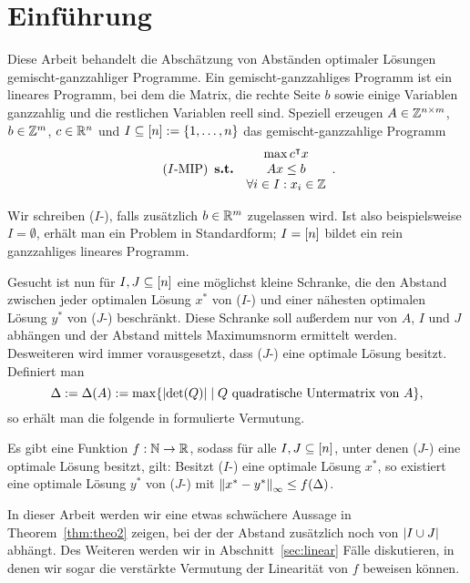 \section{Einführung}\label{introduction}

Diese Arbeit behandelt die Abschätzung von Abständen optimaler Lösungen
gemischt-ganzzahliger Programme.
Ein gemischt-ganzzahliges Programm ist ein lineares Programm, bei dem die
Matrix, die rechte Seite $b$ sowie einige Variablen ganzzahlig und die
restlichen Variablen reell sind.
Speziell erzeugen $A\in\mathbb{Z}^{n\times m}$, $b\in\mathbb{Z}^m$, $c\in\mathbb{R}^n$ und $I\subseteq[n]:=\{1,\dots,n\}$ das gemischt-ganzzahlige Programm
\begin{equation}\tag{$I$-\MIPI}
\begin{array}{lc}
	&\max c\transpose x \\
	\subjectTo &Ax\leq b\\
	&\forall i\in I: x_i\in\Z
\end{array}.
\end{equation}

Wir schreiben ($I$-\MIPR), falls zusätzlich $b\in\mathbb{R}^m$ zugelassen wird.
Ist also beispielsweise $I=\emptyset$, erhält man ein Problem in Standardform; $I=[n]$ bildet ein rein ganzzahliges lineares Programm.

Gesucht ist nun für $I,J\subseteq[n]$ eine möglichst kleine Schranke, die den Abstand zwischen jeder optimalen Lösung $x^*$ von ($I$-\MIPI) und einer nähesten optimalen Lösung $y^*$ von ($J$-\MIPI) beschränkt.
Diese Schranke soll außerdem nur von $A$, $I$ und $J$ abhängen und der Abstand mittels Maximumsnorm ermittelt werden.
Desweiteren wird immer vorausgesetzt, dass ($J$-\MIPI) eine optimale Lösung besitzt.
Definiert man
$$\Delta:=\Delta(A):=\max\{\lvert  \det(Q) \rvert \mid Q \text{ quadratische Untermatrix von } A \},$$
so erhält man die folgende in \cite{Paat2018} formulierte Vermutung.

\begin{conjecture}\label{con:delta}
	Es gibt eine Funktion $f: \mathbb{N}\rightarrow\mathbb{R}$, sodass für alle $I,J\subseteq[n]$, unter denen ($J$-\MIPI) eine optimale Lösung besitzt, gilt:
	Besitzt ($I$-\MIPI) eine optimale Lösung $x^*$, so existiert eine optimale 
	Lösung $y^*$ von ($J$-\MIPI) mit $\left\lVert x^* - y^*\right\rVert_\infty\leq f(\Delta)$.
\end{conjecture}

In dieser Arbeit werden wir eine etwas schwächere Aussage in Theorem~\ref{thm:theo2} zeigen, bei der der Abstand zusätzlich noch von $\lvert I\cup J \rvert$ abhängt.
Des Weiteren werden wir in Abschnitt~\ref{sec:linear} Fälle diskutieren, in denen wir sogar die verstärkte Vermutung der Linearität von $f$ beweisen können.
